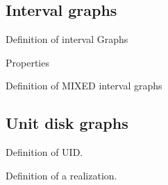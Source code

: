 \subsection{Interval graphs}

Definition of interval Graphs

Properties

Definition of MIXED interval graphs
\subsection{Unit disk graphs}

%
Definition of UID.

Definition of a realization.
